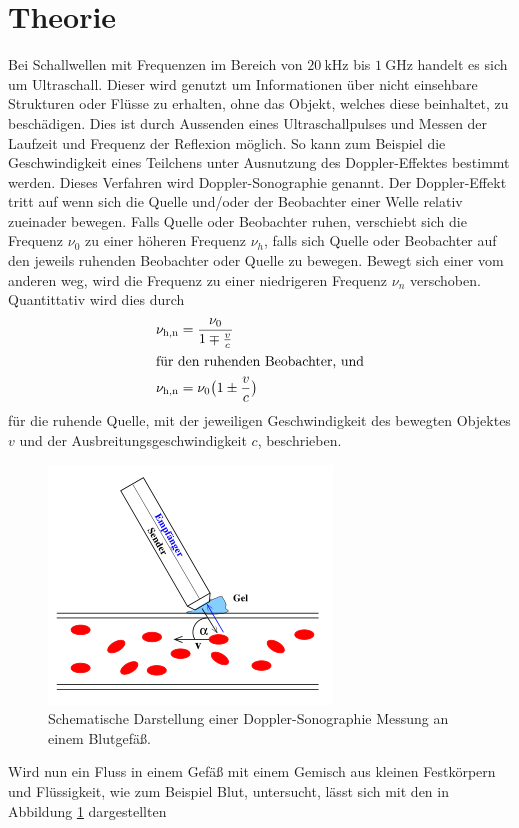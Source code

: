 \section{Theorie}
\label{sec:Theorie}
Bei Schallwellen mit Frequenzen im Bereich von $\SI{20}{\kilo\hertz}$ bis $\SI{1}{\giga\hertz}$ handelt es sich um Ultraschall. Dieser wird genutzt um Informationen über nicht einsehbare
Strukturen oder Flüsse zu erhalten, ohne das Objekt, welches diese beinhaltet, zu beschädigen. Dies ist durch Aussenden eines Ultraschallpulses und Messen der Laufzeit und Frequenz der Reflexion
möglich. So kann zum Beispiel die Geschwindigkeit eines Teilchens unter Ausnutzung des Doppler-Effektes bestimmt werden. Dieses Verfahren wird Doppler-Sonographie genannt.
Der Doppler-Effekt tritt auf wenn sich die Quelle und/oder der Beobachter einer
Welle relativ zueinader bewegen. Falls Quelle oder Beobachter ruhen, verschiebt sich die Frequenz $\nu_0$ zu einer höheren Frequenz $\nu_h$, falls sich Quelle oder Beobachter auf den jeweils ruhenden
Beobachter oder Quelle zu bewegen. Bewegt sich einer vom anderen weg, wird die Frequenz zu einer niedrigeren Frequenz $\nu_n$ verschoben. Quantittativ wird dies durch
\begin{align}
  \nu_\text{h,n} &= \frac{\nu_0}{1\mp\frac{v}{c}}\\
  \intertext{für den ruhenden Beobachter, und}
  \nu_\text{h,n} &= \nu_0 \bigl(1\pm\frac{v}{c}\bigr)
\end{align}
für die ruhende Quelle, mit der jeweiligen Geschwindigkeit des bewegten Objektes $v$ und der Ausbreitungsgeschwindigkeit $c$, beschrieben.
\begin{figure}
  \centering
  \includegraphics{images/dopplerfluss.png}
  \caption{Schematische Darstellung einer Doppler-Sonographie Messung an einem Blutgefäß.\cite{sample}}
  \label{fig:dopplerfluss}
\end{figure}
Wird nun ein Fluss in einem Gefäß mit einem Gemisch aus kleinen Festkörpern und Flüssigkeit, wie zum Beispiel Blut, untersucht, lässt sich mit den in Abbildung \ref{fig:dopplerfluss} dargestellten
